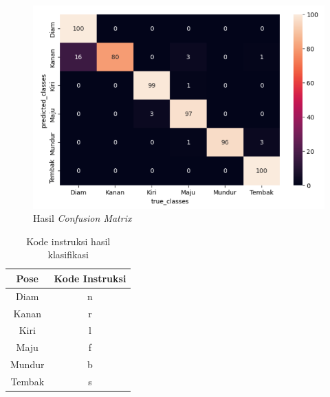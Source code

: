 \begin{figure}[H]
  \centering
  \includegraphics[width=0.7\linewidth]{../Gambar/confusionmatrix.png}
  \caption{Hasil \emph{Confusion Matrix}}
  \label{fig:confusionmatrix}
\end{figure}

\begin{table}[H]
  \centering
  \caption{Kode instruksi hasil klasifikasi}
  \label{tab:kodeinstruksi}
  \begin{tabular}{|c|c|}
  \hline
  Pose   & Kode Instruksi \\ \hline
  Diam   & n              \\ \hline
  Kanan  & r              \\ \hline
  Kiri   & l              \\ \hline
  Maju   & f              \\ \hline
  Mundur & b              \\ \hline
  Tembak & s              \\ \hline
  \end{tabular}
\end{table}


